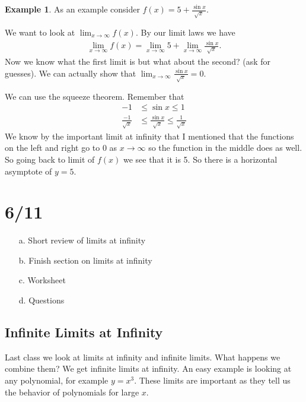 \documentclass[12pt,reqno]{article}
\theoremstyle{definition}
\newtheorem*{Example}{Example}
\begin{document}
	\begin{Example}
		As an example consider $f(x) = 5 + \frac{\sin x}{\sqrt{x}}$. 
		
		We want to look at $\lim_{x \to \infty} f(x)$. By our limit laws we have 
		\begin{align*}
			\lim_{x\to \infty} f(x) = \lim_{x \to \infty} 5 + \lim_{x\to\infty} \frac{\sin x}{\sqrt{x}}. 
		\end{align*}
		Now we know what the first limit is but what about the second? (ask for guesses). We can actually show that $\lim_{x\to\infty} \frac{\sin x}{\sqrt{x}} = 0$.  
		
		We can use the squeeze theorem. Remember that 
		\begin{align*}
			-1 &\leq \sin x \leq 1 \\
			\frac{-1}{\sqrt{x}} &\leq \frac{\sin x}{\sqrt{x}}\leq \frac{1}{\sqrt{x}} 
		\end{align*}
		We know by the important limit at infinity that I mentioned that the functions on the left and right go to 0 as $x \to \infty$ so the function in the middle does as well. So going back to limit of $f(x)$ we see that it is 5. So there is a horizontal asymptote of $y = 5$. 
	\end{Example} 

\section{6/11}
\begin{enumerate}
	\item[a.] Short review of limits at infinity 
	\item[b.] Finish section on limits at infinity
	\item[c.] Worksheet
	\item[d.] Questions
\end{enumerate}

\subsection{Infinite Limits at Infinity}
Last class we look at limits at infinity and infinite limits. What happens we combine them? We get infinite limits at infinity. An easy example is looking at any polynomial, for example $y = x^3$. These limits are important as they tell us the behavior of polynomials for large $x$. 
\end{document}
